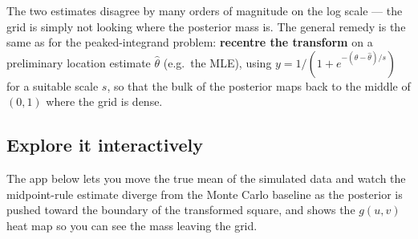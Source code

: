 \documentclass[
  letterpaper,
  DIV=11,
  numbers=noendperiod]{scrreprt}
\begin{document}
The two estimates disagree by many orders of magnitude on the log scale
--- the grid is simply not looking where the posterior mass is. The
general remedy is the same as for the peaked-integrand problem:
\textbf{recentre the transform} on a preliminary location estimate
\(\hat\theta\) (e.g.~the MLE), using
\(y = 1/(1 + e^{-(\theta-\hat\theta)/s})\) for a suitable scale \(s\),
so that the bulk of the posterior maps back to the middle of \((0,1)\)
where the grid is dense.

\subsection{Explore it interactively}\label{explore-it-interactively}

The app below lets you move the true mean of the simulated data and
watch the midpoint-rule estimate diverge from the Monte Carlo baseline
as the posterior is pushed toward the boundary of the transformed
square, and shows the \(g(u,v)\) heat map so you can see the mass
leaving the grid.
\end{document}
